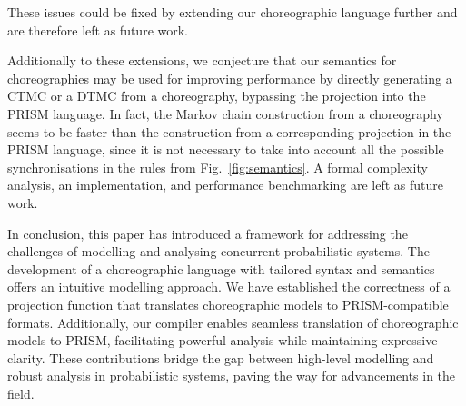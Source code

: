 These issues could be fixed by extending our choreographic language
further and are therefore left as future work.

Additionally to these extensions, we conjecture that our semantics for
choreographies may be used for improving performance by directly
generating a CTMC or a DTMC from a choreography, bypassing the
projection into the PRISM language. In fact, the Markov chain
construction from a choreography seems to be faster than the
construction from a corresponding projection in the PRISM language,
since it is not necessary to take into account all the possible
synchronisations in the rules from Fig.~\ref{fig:semantics}. A formal
complexity analysis, an implementation, and performance benchmarking
are left as future work.



In conclusion, this paper has introduced a framework for addressing
the challenges of modelling and analysing concurrent probabilistic
systems.
The development of a choreographic language with tailored syntax and
semantics offers an intuitive modelling approach. We have established
the correctness of a projection function that translates choreographic
models to PRISM-compatible formats. Additionally, our compiler enables
seamless translation of choreographic models to PRISM, facilitating
powerful analysis while maintaining expressive clarity. These
contributions bridge the gap between high-level modelling and robust
analysis in probabilistic systems, paving the way for advancements in
the field. 

